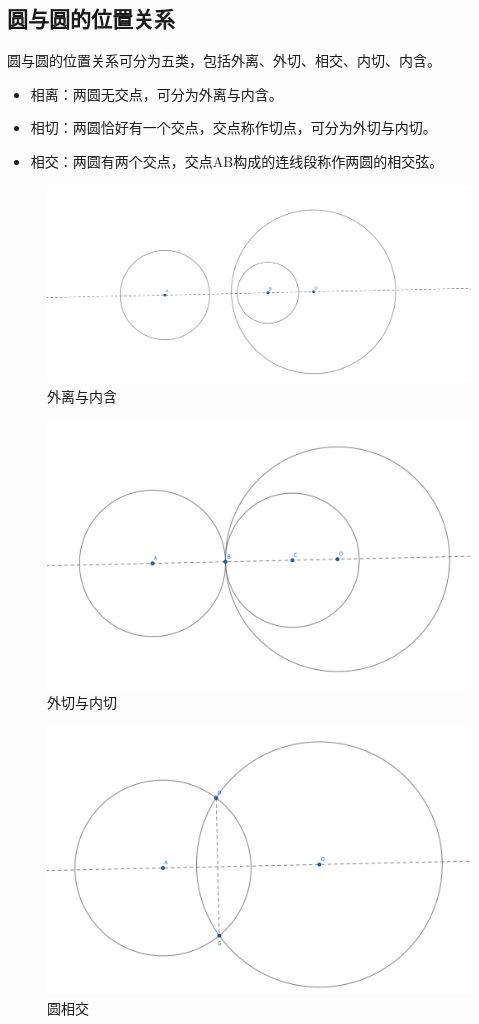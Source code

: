 \subsection{圆与圆的位置关系}
圆与圆的位置关系可分为五类，包括外离、外切、相交、内切、内含。
\begin{itemize}
    \item 相离：两圆无交点，可分为外离与内含。
    \item 相切：两圆恰好有一个交点，交点称作切点，可分为外切与内切。
    \item 相交：两圆有两个交点，交点AB构成的连线段称作两圆的相交弦。
\end{itemize}
\begin{figure}[H]
    \centering
    \includegraphics[width=0.5\linewidth]{figures/外离与内含.png}
    \caption{外离与内含}
\end{figure}
\begin{figure}[H]
    \centering
    \includegraphics[width=0.5\linewidth]{figures/外切与内切.png}
    \caption{外切与内切}
\end{figure}
\begin{figure}[H]
    \centering
    \includegraphics[width=0.5\linewidth]{figures/圆相交.png}
    \caption{圆相交}
\end{figure}




